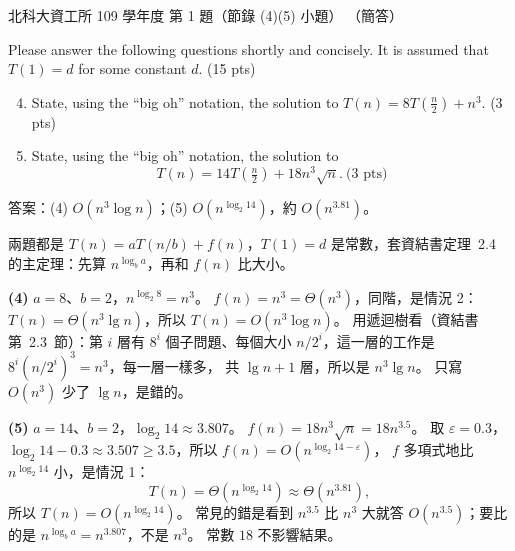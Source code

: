 \begin{pastexam}[label={px:ntut-109-ci-02}]{北科大資工所 109 學年度 第 1 題（節錄 (4)(5) 小題）}
（簡答）

Please answer the following questions shortly and concisely. It is assumed that $T(1)=d$ for some
constant $d$. (15 pts)
\begin{enumerate}[label=(\arabic*)]
\setcounter{enumi}{3}
\item State, using the ``big oh'' notation, the solution to $T(n)=8T\left(\frac{n}{2}\right)+n^3$.
(3 pts)
\item State, using the ``big oh'' notation, the solution to
\[T(n)=14T\left(\tfrac{n}{2}\right)+18n^3\sqrt{n}.\ \text{(3 pts)}\]
\end{enumerate}
\end{pastexam}

\begin{pastsoln}
答案：(4) $O(n^3 \log n)$；(5) $O(n^{\log_2 14})$，約 $O(n^{3.81})$。

兩題都是 $T(n) = aT(n/b) + f(n)$，$T(1) = d$ 是常數，套資結書定理~2.4 的主定理：先算
$n^{\log_b a}$，再和 $f(n)$ 比大小。

\textbf{(4)} $a = 8$、$b = 2$，$n^{\log_2 8} = n^3$。 $f(n) = n^3 = \Theta(n^3)$，同階，是情況 2：
$T(n) = \Theta(n^3 \lg n)$，所以 $T(n) = O(n^3 \log n)$。 用遞迴樹看（資結書第~2.3~節）：第 $i$
層有 $8^i$ 個子問題、每個大小 $n/2^i$，這一層的工作是 $8^i (n/2^i)^3 = n^3$，每一層一樣多，
共 $\lg n + 1$ 層，所以是 $n^3 \lg n$。 只寫 $O(n^3)$ 少了 $\lg n$，是錯的。

\textbf{(5)} $a = 14$、$b = 2$，$\log_2 14 \approx 3.807$。 $f(n) = 18 n^3 \sqrt{n} = 18 n^{3.5}$。 取
$\varepsilon = 0.3$，$\log_2 14 - 0.3 \approx 3.507 \ge 3.5$，所以 $f(n) = O(n^{\log_2 14 - \varepsilon})$，
$f$ 多項式地比 $n^{\log_2 14}$ 小，是情況 1：
\[
T(n) = \Theta(n^{\log_2 14}) \approx \Theta(n^{3.81}) ,
\]
所以 $T(n) = O(n^{\log_2 14})$。 常見的錯是看到 $n^{3.5}$ 比 $n^3$ 大就答 $O(n^{3.5})$；要比的是
$n^{\log_b a} = n^{3.807}$，不是 $n^3$。 常數 $18$ 不影響結果。
\end{pastsoln}
